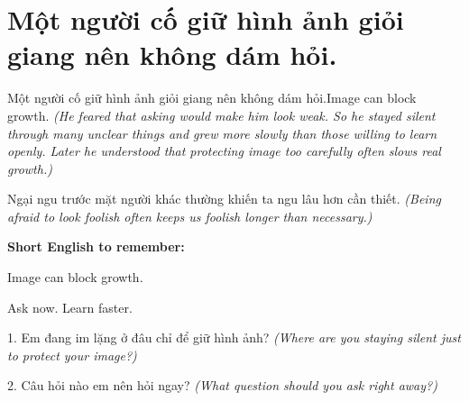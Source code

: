 \section{Một người cố giữ hình ảnh giỏi giang nên không dám hỏi.}
\begin{truyen}{Một người cố giữ hình ảnh giỏi giang nên không dám hỏi.}{Image can block growth.}
\textit{(He feared that asking would make him look weak. So he stayed silent through many unclear things and grew more slowly than those willing to learn openly. Later he understood that protecting image too carefully often slows real growth.)}
\end{truyen}
\begin{baihoc}
Ngại ngu trước mặt người khác thường khiến ta ngu lâu hơn cần thiết.
\textit{(Being afraid to look foolish often keeps us foolish longer than necessary.)}
\end{baihoc}
\begin{ghinhoanh}
\textbf{Short English to remember:}

Image can block growth.

Ask now. Learn faster.
\end{ghinhoanh}
\begin{tuhocnhanh}
1. Em đang im lặng ở đâu chỉ để giữ hình ảnh? \textit{(Where are you staying silent just to protect your image?)}

2. Câu hỏi nào em nên hỏi ngay? \textit{(What question should you ask right away?)}
\end{tuhocnhanh}
\ngancach

